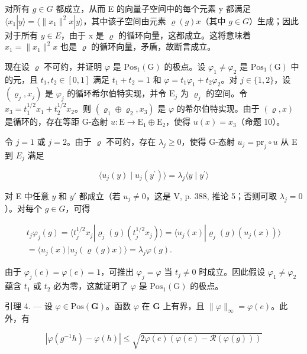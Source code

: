 对所有 \(g \in G\) 都成立，从而 E 的向量子空间中的每个元素 y 都满足 \(\langle x_{1} | y \rangle = \langle \|x_{1}\|^{2}x | y \rangle\)，其中该子空间由元素 \(\varrho(g)x\)（其中 \(g \in G\)）生成；因此对于所有 \(y \in E\)，由于 x 是 \(\varrho\) 的循环向量，这都成立。这将意味着 \(x_{1} = \|x_{1}\|^{2}x\) 也是 \(\varrho\) 的循环向量，矛盾，故断言成立。

现在设 \(\varrho\) 不可约，并证明 \(\varphi\) 是 \(\mathrm{Pos}_1(\mathrm{G})\) 的极点。设 \(\varphi_1 \neq \varphi_2\) 是 \(\mathrm{Pos}_1(\mathrm{G})\) 中的元，且 \(t_1, t_2 \in [0,1]\) 满足 \(t_1 + t_2 = 1\) 和 \(\varphi = t_1\varphi_1 + t_2\varphi_2\)。对 \(j \in \{1,2\}\)，设 \((\varrho_j, x_j)\) 是 \(\varphi_j\) 的循环希尔伯特实现，并令 \(\mathrm{E}_j\) 为 \(\varrho_j\) 的空间。令 \(x_3 = t_1^{1/2}x_1 + t_2^{1/2}x_2\)。则 \((\varrho_1 \oplus \varrho_2, x_3)\) 是 \(\varphi\) 的希尔伯特实现。由于 \((\varrho, x)\) 是循环的，存在等距 G-态射 \(u: \mathrm{E} \to \mathrm{E}_1 \oplus \mathrm{E}_2\)，使得 \(u(x) = x_3\)（命题 10）。

令 \(j = 1\) 或 \(j = 2\)。由于 \(\varrho\) 不可约，存在 \(\lambda_j \geqslant 0\)，使得 G-态射 \(u_j = \mathrm{pr}_j \circ u\) 从 E 到 \(E_j\) 满足

\[
\langle u _ {j} (y) \mid u _ {j} (y ^ {\prime}) \rangle = \lambda_ {j} \langle y \mid y ^ {\prime} \rangle
\]

对 E 中任意 \(y\) 和 \(y'\) 都成立（若 \(u_j \neq 0\)，这是 V, p. 388, 推论 5；否则可取 \(\lambda_j = 0\)）。对每个 \(g \in G\)，可得

\[
\begin{array}{r} t _ {j} \varphi_ {j} (g) = \langle t _ {j} ^ {1 / 2} x _ {j} | \varrho_ {j} (g) (t _ {j} ^ {1 / 2} x _ {j}) \rangle = \langle u _ {j} (x) | \varrho_ {j} (g) (u _ {j} (x)) \rangle \\ = \langle u _ {j} (x) | u _ {j} (\varrho (g) x) \rangle = \lambda_ {j} \varphi (g). \end{array}
\]

由于 \(\varphi_{j}(e) = \varphi(e) = 1\)，可推出 \(\varphi_{j} = \varphi\) 当 \(t_{j} \neq 0\) 时成立。因此假设 \(\varphi_{1} \neq \varphi_{2}\) 蕴含 \(t_{1}\) 或 \(t_{2}\) 必为零，这就证明了 \(\varphi\) 是 \(\mathrm{Pos}_{1}(\mathrm{G})\) 的极点。

引理 4. --- 设 \(\varphi\in\mathrm{Pos}(\mathbf{G})\)。函数 \(\varphi\) 在 \(\mathbf{G}\) 上有界，且 \(\|\varphi\|_{\infty}=\varphi(e)\)。此外，有

\[
| \varphi (g ^ {- 1} h) - \varphi (h) | \leqslant \sqrt {2 \varphi (e) (\varphi (e) - \mathcal {R} (\varphi (g)))}\tag{1}
\]

